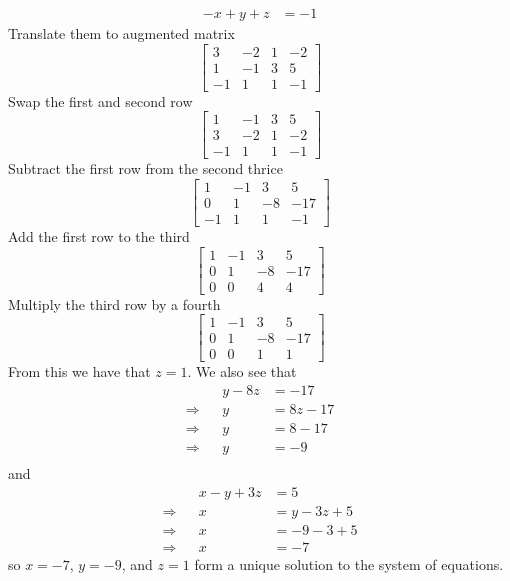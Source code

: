 \documentclass[../main.tex]{subfiles}
\begin{document}
\begin{enumerate}[a)]
\begin{align*}
			-x + y + z &= -1
		\end{align*}
		Translate them to augmented matrix
		$$\left[\begin{array}{ccc|c}
			3 & -2 & 1 & -2 \\
			1 & -1 & 3 & 5 \\
			-1 & 1 & 1 & -1
		\end{array}\right]$$
		Swap the first and second row
		$$\left[\begin{array}{ccc|c}
			1 & -1 & 3 & 5 \\
			3 & -2 & 1 & -2 \\
			-1 & 1 & 1 & -1
		\end{array}\right]$$
		Subtract the first row from the second thrice
		$$\left[\begin{array}{ccc|c}
			1 & -1 & 3 & 5 \\
			0 & 1 & -8 & -17 \\
			-1 & 1 & 1 & -1
		\end{array}\right]$$
		Add the first row to the third
		$$\left[\begin{array}{ccc|c}
			1 & -1 & 3 & 5 \\
			0 & 1 & -8 & -17 \\
			0 & 0 & 4 & 4
		\end{array}\right]$$
		Multiply the third row by a fourth
		$$\left[\begin{array}{ccc|c}
			1 & -1 & 3 & 5 \\
			0 & 1 & -8 & -17 \\
			0 & 0 & 1 & 1
		\end{array}\right]$$
		From this we have that $z = 1$.
		We also see that
		\begin{align*}
			&& y - 8z &= -17 \\
			\Rightarrow && y &= 8z - 17 \\
			\Rightarrow && y &= 8 - 17 \\
			\Rightarrow && y &= -9 \\
		\end{align*}
		and
		\begin{align*}
			&& x - y + 3z &= 5 \\
			\Rightarrow && x &= y - 3z + 5 \\
			\Rightarrow && x &= -9 - 3 + 5 \\
			\Rightarrow && x &= -7
		\end{align*}
		so $x = -7$, $y = -9$, and $z = 1$ form a unique solution to the system of equations.
\end{enumerate}
\end{document}
